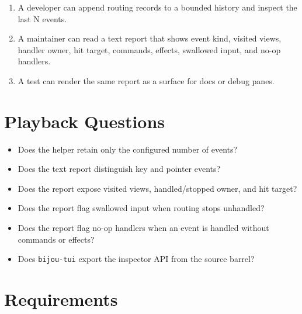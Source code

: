 \begin{enumerate}
\def\labelenumi{\arabic{enumi}.}
\tightlist
\item
  A developer can append routing records to a bounded history and inspect the last N events.
\item
  A maintainer can read a text report that shows event kind, visited views, handler owner, hit target, commands, effects, swallowed input, and no-op handlers.
\item
  A test can render the same report as a surface for docs or debug panes.
\end{enumerate}

\section{Playback Questions}\label{record-123-playback-questions}

\begin{itemize}
\tightlist
\item
  Does the helper retain only the configured number of events?
\item
  Does the text report distinguish key and pointer events?
\item
  Does the report expose visited views, handled/stopped owner, and hit target?
\item
  Does the report flag swallowed input when routing stops unhandled?
\item
  Does the report flag no-op handlers when an event is handled without commands or effects?
\item
  Does \texttt{b\allowbreak{}i\allowbreak{}j\allowbreak{}o\allowbreak{}u\allowbreak{}-\allowbreak{}t\allowbreak{}u\allowbreak{}i} export the inspector API from the source barrel?
\end{itemize}

\section{Requirements}\label{record-123-requirements}

